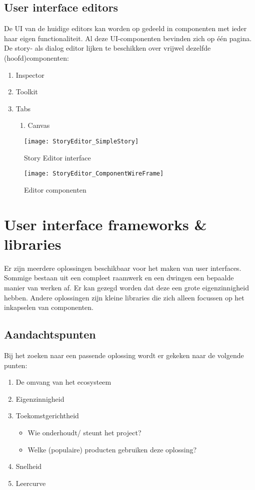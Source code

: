 \subsection{User interface editors}
De UI van de huidige editors kan worden op gedeeld in componenten met ieder haar eigen functionaliteit. Al deze UI-componenten bevinden zich op één pagina. De story- als dialog editor lijken te beschikken over vrijwel dezelfde (hoofd)componenten:
\begin{enumerate}
    \item Inspector
    \item Toolkit
    \item Tabs
    \begin{enumerate}
        \item Canvas
    \end{enumerate}
\end{enumerate}

\begin{figure}[htb]
    \texttt{[image: StoryEditor\_SimpleStory]}
    \caption{Story Editor interface}
    \label{fig:storyeditorinterface}
    \centering
\end{figure}

\begin{figure}[htb]
    \texttt{[image: StoryEditor\_ComponentWireFrame]}
    \caption{Editor componenten}
    \label{fig:storyeditorcomponents}
    \centering
\end{figure}

\section{User interface frameworks \& libraries}
Er zijn meerdere oplossingen beschikbaar voor het maken van user interfaces. Sommige bestaan uit een compleet raamwerk en een dwingen een bepaalde manier van werken af. Er kan gezegd worden dat deze een grote eigenzinnigheid hebben. Andere oplossingen zijn kleine libraries die zich alleen focussen op het inkapselen van componenten.

\subsection{Aandachtspunten}
Bij het zoeken naar een passende oplossing wordt er gekeken naar de volgende punten:
\begin{enumerate}
    \item De omvang van het ecosysteem
    \item Eigenzinnigheid
    \item Toekomstgerichtheid
    \begin{itemize}
        \item Wie onderhoudt/ steunt het project?
        \item Welke (populaire) producten gebruiken deze oplossing?
    \end{itemize}
    \item Snelheid
    \item Leercurve    
\end{enumerate}

